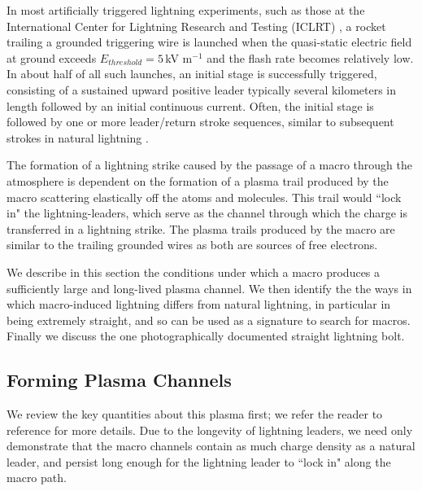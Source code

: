\documentclass[%
 reprint,
 amsmath,amssymb,
 aps,
 nofootinbib, %
]{revtex4-2}
\begin{document}
    In most artificially triggered lightning experiments, such as those at the International Center for Lightning Research and Testing (ICLRT) \citep{Hill2012, Hill2013}, a rocket trailing a grounded triggering wire is launched when the quasi-static electric field at ground exceeds $E_{threshold} = 5\,$kV m$^{-1}$ and the flash rate becomes relatively low. In about half of all such launches, an initial stage is successfully triggered, consisting of a sustained upward positive leader typically several kilometers in length followed by an initial continuous current. Often, the initial stage is followed by one or more leader/return stroke sequences, similar to subsequent strokes in natural lightning \citep{Wang1999, rocket2012}.

    The formation of a lightning strike caused by the passage of a macro through the atmosphere is dependent on the formation of a plasma trail produced by the macro scattering elastically off the atoms and molecules. This trail would ``lock in" the lightning-leaders, which serve as the channel through which the charge is transferred in a lightning strike. The plasma trails produced by the macro are similar to the trailing grounded wires as both are sources of free electrons.

    We describe in this section the conditions under which a macro produces a sufficiently large and long-lived plasma channel. We then identify the the ways in which macro-induced lightning differs from natural lightning, in particular in being extremely straight, and so can be used as a signature to search for macros. Finally we discuss the one photographically documented straight lightning bolt.

    \subsection{Forming Plasma Channels} %
    \label{sub:macro_induced_plasma_channels}

        We review the key quantities about this plasma first; we refer the reader to reference \citep{Sidhu2018auv} for more details. Due to the longevity of lightning leaders, we need only demonstrate that the macro channels contain as much charge density as a natural leader, and persist long enough for the lightning leader to ``lock in" along the macro path.
\end{document}

